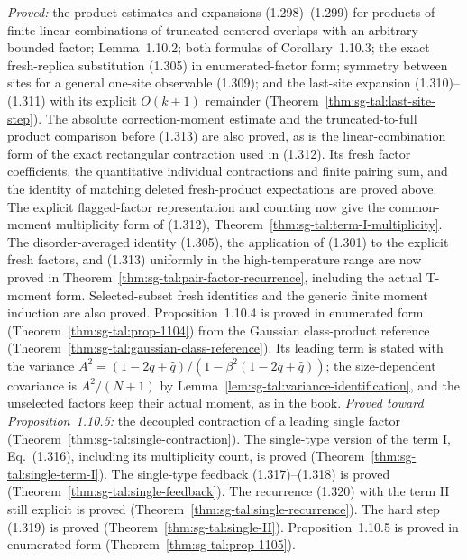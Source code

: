 \begin{remark}\label{rem:sg-tal:overlap-clt-status}
\emph{Proved:} the product estimates and expansions (1.298)--(1.299) for products of finite
linear combinations of truncated centered overlaps with an arbitrary bounded factor;
Lemma~1.10.2; both formulas of Corollary~1.10.3; the exact fresh-replica substitution (1.305)
in enumerated-factor form; symmetry between sites for a general one-site observable (1.309);
and the last-site expansion (1.310)--(1.311) with its explicit $O(k+1)$ remainder
(Theorem~\ref{thm:sg-tal:last-site-step}). The absolute correction-moment estimate and
the truncated-to-full product comparison before (1.313) are also proved, as is the
linear-combination form of the exact rectangular contraction used in (1.312). Its fresh
factor coefficients, the quantitative individual contractions and finite pairing sum,
and the identity of matching deleted fresh-product expectations are proved above.
The explicit flagged-factor representation and counting now give the common-moment
multiplicity form of (1.312), Theorem~\ref{thm:sg-tal:term-I-multiplicity}.
The disorder-averaged identity (1.305), the application of (1.301) to the explicit
fresh factors, and (1.313) uniformly in the high-temperature range are now proved in
Theorem~\ref{thm:sg-tal:pair-factor-recurrence}, including the actual T-moment form.
Selected-subset fresh identities and the generic finite moment induction are also proved.
Proposition~1.10.4 is proved in enumerated form
(Theorem~\ref{thm:sg-tal:prop-1104}) from the Gaussian class-product reference
(Theorem~\ref{thm:sg-tal:gaussian-class-reference}). Its leading term is stated with the
variance $A^2=(1-2q+\hat q)/(1-\beta^2(1-2q+\hat q))$; the size-dependent covariance is $A^2/(N+1)$ by
Lemma~\ref{lem:sg-tal:variance-identification}, and the unselected factors
keep their actual moment, as in the book.
\emph{Proved toward Proposition~1.10.5:} the decoupled contraction of a leading single factor
(Theorem~\ref{thm:sg-tal:single-contraction}).
The single-type version of the term I, Eq.~(1.316), including its multiplicity count, is proved
(Theorem~\ref{thm:sg-tal:single-term-I}).
The single-type feedback (1.317)--(1.318) is proved
(Theorem~\ref{thm:sg-tal:single-feedback}).
The recurrence (1.320) with the term II still explicit is proved
(Theorem~\ref{thm:sg-tal:single-recurrence}).
The hard step (1.319) is proved (Theorem~\ref{thm:sg-tal:single-II}).
Proposition~1.10.5 is proved in enumerated form (Theorem~\ref{thm:sg-tal:prop-1105}).

\end{remark}
